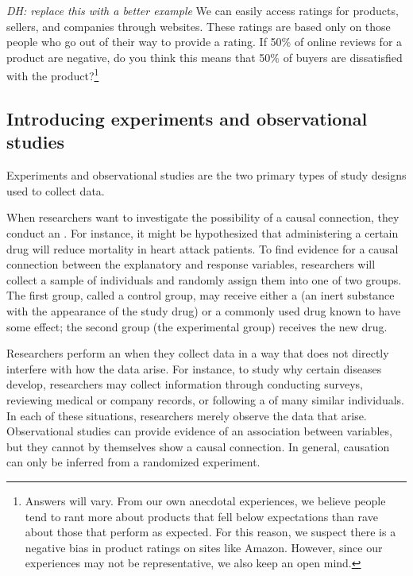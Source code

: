 \begin{doublespace}
\begin{exercise}
	
\textit{DH: replace this with a better example}
We can easily access ratings for products, sellers, and companies through websites. These ratings are based only on those people who go out of their way to provide a rating. If 50\% of online reviews for a product are negative, do you think this means that 50\% of buyers are dissatisfied with the product?\footnote{Answers will vary. From our own anecdotal experiences, we believe people tend to rant more about products that fell below expectations than rave about those that perform as expected. For this reason, we suspect there is a negative bias in product ratings on sites like Amazon. However, since our experiences may not be representative, we also keep an open mind.}
\end{exercise}


\subsection{Introducing experiments and observational studies}

Experiments and observational studies are the two primary types of study designs used to collect data.

When researchers want to investigate the possibility of a causal connection, they conduct an . For instance, it might be hypothesized that administering a certain drug will reduce mortality in heart attack patients. To find evidence for a causal connection between the explanatory and response variables, researchers will collect a sample of individuals and randomly assign them into one of two groups. The first group, called a control group, may receive either a  (an inert substance with the appearance of the study drug) or a commonly used drug known to have some effect; the second group (the experimental group) receives the new drug. 

Researchers perform an  when they collect data in a way that does not directly interfere with how the data arise. For instance, to study why certain diseases develop, researchers may collect information through conducting surveys, reviewing medical or company records, or following a  of many similar individuals. In each of these situations, researchers merely observe the data that arise. Observational studies can provide evidence of an association between variables, but they cannot by themselves show a causal connection. In general, causation can only be inferred from a randomized experiment.


\end{doublespace}
